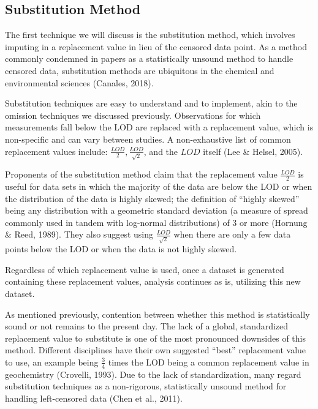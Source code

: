\documentclass[12pt, twoside]{amherstthesis}
\begin{document}
\hypertarget{Substitution}{%
\subsection{Substitution Method}\label{Substitution}}

The first technique we will discuss is the substitution method, which involves imputing in a replacement value in lieu of the censored data point. As a method commonly condemned in papers as a statistically unsound method to handle censored data, substitution methods are ubiquitous in the chemical and environmental sciences (Canales, 2018).

Substitution techniques are easy to understand and to implement, akin to the omission techniques we discussed previously. Observations for which measurements fall below the LOD are replaced with a replacement value, which is non-specific and can vary between studies. A non-exhaustive list of common replacement values include: \(\frac{LOD}{2}, \frac{LOD}{\sqrt2}\), and the \(LOD\) itself (Lee \& Helsel, 2005).

Proponents of the substitution method claim that the replacement value \(\frac{LOD}{2}\) is useful for data sets in which the majority of the data are below the LOD or when the distribution of the data is highly skewed; the definition of ``highly skewed'' being any distribution with a geometric standard deviation (a measure of spread commonly used in tandem with log-normal distributions) of 3 or more (Hornung \& Reed, 1989). They also suggest using \(\frac{LOD}{\sqrt2}\) when there are only a few data points below the LOD or when the data is not highly skewed.

Regardless of which replacement value is used, once a dataset is generated containing these replacement values, analysis continues as is, utilizing this new dataset.

As mentioned previously, contention between whether this method is statistically sound or not remains to the present day. The lack of a global, standardized replacement value to substitute is one of the most pronounced downsides of this method. Different disciplines have their own suggested ``best'' replacement value to use, an example being \(\frac{3}{4}\) times the LOD being a common replacement value in geochemistry (Crovelli, 1993). Due to the lack of standardization, many regard substitution techniques as a non-rigorous, statistically unsound method for handling left-censored data (Chen et al., 2011).
\end{document}
